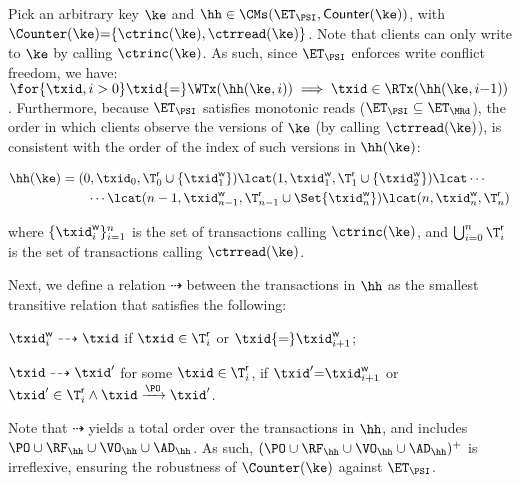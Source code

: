 Pick an arbitrary key $\ke$ and $\hh \in \CMs(\ET_{\PSI}, \mathsf{Counter}(\ke))$, 
with $\Counter(\ke) {=} \{\ctrinc(\ke), \ctrread(\ke)\}$. 
Note that clients can only write to $\ke$ by calling $\ctrinc(\ke)$.
As such, since $\ET_{\PSI}$ enforces write conflict freedom, we have: 
$\for{\txid, i > 0} \txid {=} \WTx(\hh(\ke, i)) \implies \txid \in \RTx(\hh(\ke, i{-}1))$. 
Furthermore, because $\ET_{\PSI}$ satisfies monotonic reads ($\ET_{\PSI} \subseteq \ET_{\MRd}$),
the order in which clients observe the versions of $\ke$ (by calling $\ctrread(\ke)$), 
is consistent with the order of the index of such versions in $\hh(\ke)$:
%

\vspace*{-11pt}
{\small%
\begin{align*}
	\hh(\ke) & = (0, \txid_{0}, \T^{\mathsf{r}}_{0} \cup \{\txid^{\mathsf{w}}_1\}) 
	\lcat (1, \txid^{\mathsf{w}}_{1}, \T^{\mathsf{r}}_{1} \cup \{\txid^{\mathsf{w}}_2\}) 
	\lcat \cdots  \\
	& \qquad \cdots \lcat (n-1, \txid^{\mathsf{w}}_{n-1}, \T^{\mathsf{r}}_{n-1} \cup \Set{\txid^{\mathsf{w}}_n})
	\lcat (n, \txid^{\mathsf{w}}_n, \T^{\mathsf{r}}_{n})
\end{align*}%
}%
%
\vspace*{-13pt}

\noindent where $\{\txid^{\mathsf{w}}_{i}\}_{i=1}^{n}$ is the set of transactions calling $\ctrinc(\ke)$, 
and $\bigcup_{i=0}^{n} \T^{\mathsf{r}}_{i}$ is the set of transactions calling $\ctrread(\ke)$. 

Next, we define a relation $\dashrightarrow$ between
the transactions in $\hh$ as the smallest transitive relation that 
satisfies the following: 
\begin{enumerate*}
	\item $\txid^{\mathsf{w}}_{i} 
	\dashrightarrow \txid$ if $\txid \in \T^{\mathsf{r}}_{i}$ 
	or $\txid {=} \txid^{\mathsf{w}}_{i+1}$; 
	\item $\txid \dashrightarrow \txid'$ 
	for some $\txid \in \T^{\mathsf{r}}_{i}$,
	if $\txid' {=} \txid^{\mathsf{w}}_{i+1}$
	or $\txid' \in \T^{\mathsf{r}}_{i} \land \txid \xrightarrow{\PO} \txid'$. 
\end{enumerate*}
%
Note that $\dashrightarrow$ yields a total order over the transactions in $\hh$, 
and includes $\PO \cup \RF_{\hh} \cup \VO_{\hh} \cup \AD_{\hh}$. 
As such, $(\PO \cup \RF_{\hh} \cup \VO_{\hh} \cup \AD_{\hh})^+$ is irreflexive, 
ensuring the robustness of $\Counter(\ke)$ against $\ET_{\PSI}$.


